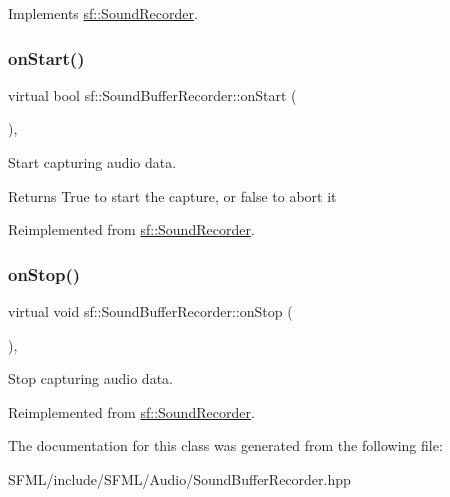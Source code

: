 Implements \mbox{\hyperlink{classsf_1_1_sound_recorder_a2670124cbe7a87c7e46b4840807f4fd7}{sf\+::\+Sound\+Recorder}}.

\mbox{\label{classsf_1_1_sound_buffer_recorder_a531a7445fc8a48eaf9fc039c83f17c6f}} 
\subsubsection{\texorpdfstring{onStart()}{onStart()}}
{\footnotesize\ttfamily virtual bool sf\+::\+Sound\+Buffer\+Recorder\+::on\+Start (\begin{DoxyParamCaption}{ }\end{DoxyParamCaption})\hspace{0.3cm}{\ttfamily [protected]}, {\ttfamily [virtual]}}



Start capturing audio data. 

\begin{DoxyReturn}{Returns}
True to start the capture, or false to abort it \begin{DoxyVerb}\end{DoxyVerb}
 
\end{DoxyReturn}


Reimplemented from \mbox{\hyperlink{classsf_1_1_sound_recorder_a7af418fb036201d3f85745bef78ce77f}{sf\+::\+Sound\+Recorder}}.

\mbox{\label{classsf_1_1_sound_buffer_recorder_ab8e53849312413431873a5869d509f1e}} 
\subsubsection{\texorpdfstring{onStop()}{onStop()}}
{\footnotesize\ttfamily virtual void sf\+::\+Sound\+Buffer\+Recorder\+::on\+Stop (\begin{DoxyParamCaption}{ }\end{DoxyParamCaption})\hspace{0.3cm}{\ttfamily [protected]}, {\ttfamily [virtual]}}



Stop capturing audio data. 

\begin{DoxyVerb}\end{DoxyVerb}
 

Reimplemented from \mbox{\hyperlink{classsf_1_1_sound_recorder_aefc36138ca1e96c658301280e4a31b64}{sf\+::\+Sound\+Recorder}}.



The documentation for this class was generated from the following file\+:\begin{DoxyCompactItemize}
\item 
S\+F\+M\+L/include/\+S\+F\+M\+L/\+Audio/Sound\+Buffer\+Recorder.\+hpp\end{DoxyCompactItemize}
